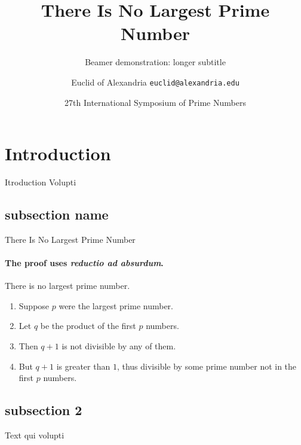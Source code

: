 \documentclass{beamer}
\title{There Is No Largest Prime Number}
\subtitle{Beamer demonstration: longer subtitle}
\institute{IGN}
\date[ISPN ’80]{27th International Symposium of Prime Numbers}
\author[Euclid]{Euclid of Alexandria \texttt{euclid@alexandria.edu}}
\begin{document}
    \begin{frame}[plain]
        \titlepage{}
    \end{frame}

    \section{Introduction}
        \begin{frame}{Itroduction}
            Volupti
        \end{frame}
        \subsection{subsection name}
            \begin{frame}{There Is No Largest Prime Number}
                \framesubtitle{The proof uses \textit{reductio ad absurdum}.}
                \begin{theorem}
                    There is no largest prime number. \end{theorem}
                \begin{enumerate}
                    \item<1-| alert@1> Suppose $p$ were the largest prime number.
                    \item<2-> Let $q$ be the product of the first $p$ numbers.
                    \item<3-> Then $q+1$ is not divisible by any of them.
                    \item<1-> But $q + 1$ is greater than $1$, thus divisible by some prime
                    number not in the first $p$ numbers.
                \end{enumerate}
            \end{frame}
        \subsection{subsection 2}
        \begin{frame}
            Text qui volupti
        \end{frame}
\end{document}
